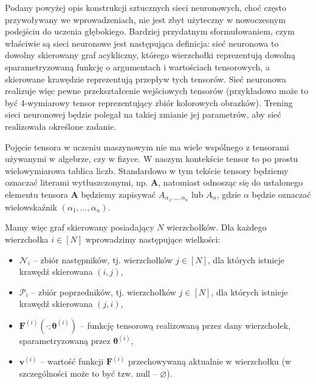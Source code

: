 \documentclass{myclass}
\begin{document}
Podany powyżej opis konstrukcji sztucznych sieci neuronowych, choć często przywoływany we
wprowadzeniach, nie jest zbyt użyteczny w nowoczesnym podejściu do uczenia głębokiego. Bardziej
przydatnym sformułowaniem, czym właściwie są sieci neuronowe jest następująca definicja: sieć
neuronowa to dowolny skierowany graf acykliczny, którego wierzchołki reprezentują dowolną
sparametryzowaną funkcję o argumentach i wartościach tensorowych, a skierowane krawędzie
reprezentują przepływ tych tensorów. Sieć neuronowa realizuje więc pewne przekształcenie wejściowych
tensorów (przykładowo może to być 4-wymiarowy tensor reprezentujący zbiór kolorowych obrazków).
Trening sieci neuronowej będzie polegał na takiej zmianie jej parametrów, aby sieć realizowała
określone zadanie.

\medskip

Pojęcie tensora w uczeniu maszynowym nie ma wiele wspólnego z tensorami używanymi w algebrze, czy w
fizyce. W naszym kontekście tensor to po prostu wielowymiarowa tablica liczb. Standardowo w tym
tekście tensory będziemy oznaczać literami wytłuszczonymi, np. \(\bm{A}\), natomiast odnosząc się do
ustalonego elementu tensora \(\bm{A}\) będziemy zapisywać \(A_{\alpha_1,\ldots,\alpha_n}\) lub
\(A_\alpha\), gdzie \(\alpha\) będzie oznaczać wielowskaźnik \((\alpha_1,\ldots,\alpha_n)\).

\medskip

Mamy więc graf skierowany posiadający \(N\) wierzchołków. Dla każdego wierzchołka \(i \in [N]\)
wprowadzimy następujące wielkości:
\begin{itemize}
    \item \(\mathscr{N}_i\) -- zbiór następników, tj. wierzchołków \(j \in [N]\), dla których
    istnieje krawędź skierowana \((i,j)\),
    
    \item \(\mathscr{P}_i\) -- zbiór poprzedników, tj. wierzchołków \(j \in [N]\), dla których
    istnieje krawędź skierowana \((j,i)\),

    \item \(\bm{F}^{(i)}\left(\cdot ; \bm{\theta}^{(i)}\right)\) -- funkcję tensorową realizowaną
    przez dany wierzchołek, sparametryzowaną przez \(\bm{\theta}^{(i)}\),

    \item \(\bm{v}^{(i)}\) -- wartość funkcji \(\bm{F}^{(i)}\) przechowywaną aktualnie w wierzchołku
    (w szczególności może to być tzw. null -- \(\varnothing\)).

\end{itemize}
\end{document}
